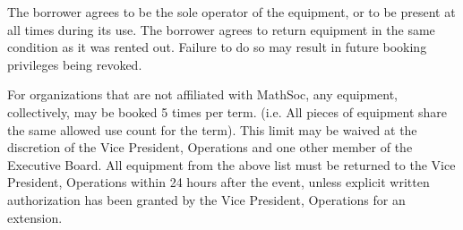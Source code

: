 The borrower agrees to be the sole operator of the equipment, or to be present
at all times during its use. The borrower agrees to return equipment in the same condition as it was rented out. Failure to do so may result in future booking privileges being revoked.

For organizations that are not affiliated with MathSoc, any equipment,
collectively, may be booked 5 times per term. (i.e. All pieces of equipment
share the same allowed use count for the term). This limit may be waived at the
discretion of the Vice President, Operations and one other member of the
Executive Board. All equipment from the above list must be returned to the Vice President, 
Operations within 24 hours after the event, unless explicit written authorization has been 
granted by the Vice President, Operations for an extension. 

